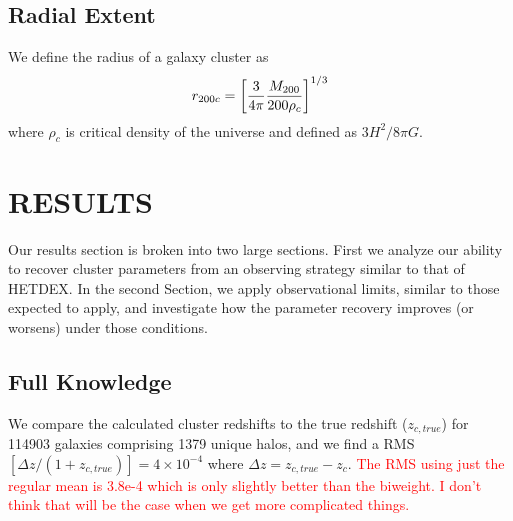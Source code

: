 \documentclass[apj, revtex4]{emulateapj}
\newcommand{\editorial}[1]{\textcolor{red}{#1}}
\begin{document}
\subsection{Radial Extent}
We define the radius of a galaxy cluster as
\begin{equation}
	r_{200c} = \bigg{[} \frac{3}{4\pi} \frac{M_{200}}{200\rho_c} \bigg{]}^{1/3}
\end{equation}
where $\rho_c$ is critical density of the universe and defined as $3H^2/8\pi G$.



\section{RESULTS}
Our results section is broken into two large sections. First we analyze our ability to recover cluster parameters from an observing strategy similar to that of HETDEX. In the second Section, we apply observational limits, similar to those expected to apply, and investigate how the parameter recovery improves (or worsens) under those conditions. 

\subsection{Full Knowledge}
We compare the calculated cluster redshifts to the true redshift ($z_{c,true}$) for 114903 galaxies comprising 1379 unique halos, and we find a RMS$[\Delta z/(1+z_{c,true})]= 4\times 10^{-4}$ where $\Delta z = z_{c,true} - z_{c}$. \editorial{The RMS using just the regular mean is 3.8e-4 which is only slightly better than the biweight. I don't think that will be the case when we get more complicated things.}
\end{document}
